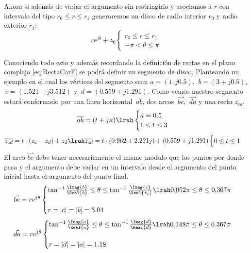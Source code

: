 Ahora si además de variar el argumento sin restringirlo y asociamos a $r$ con intervalo del tipo $r_0\leq r\leq r_1$ generaremos un disco de radio interior $r_0$ y radio exterior $r_1$:
\begin{equation}
    re^{j\theta}+z_0
    \begin{cases}
        r_0\leq r\leq r_1\\
        -\pi<\theta\leq\pi
    \end{cases}
\end{equation}
\begin{figure}[H]
    \centering
    
    \label{fig:DiscoCF}
\end{figure}
Conociendo todo esto y además recordando la definición de rectas en el plano complejo \ref{eq:RectaCarF} se podrá definir un segmento de disco. Planteando un ejemplo en el cual los vértices del segmento sean $a=(1,j0.5)$, $\ b=(3+j0.5)$, $\ c=(1.521+j3.512)$ y $\ d=(0.559+j1.291)$. Como vemos nuestro segmento estará conformado por una linea horizontal $\ \overline{ab}$, dos arcos $\ \vec{bc}$, $\ \Vec{da}$ y una recta $\overline{z_{cd}}$.
\begin{equation}
    \overline{ab}=(t+j\kappa)\lrah
    \begin{cases}
        \kappa=0.5\\
        1\leq t\leq3
    \end{cases}
\end{equation}
\begin{equation}
    \overline{z_{cd}}=t\cdot(z_c-z_d)+z_d \lrah\overline{z_{cd}}=t\cdot(0.962+2.221j)+(0.559+j1.291)
    \begin{cases}
         0\leq t\leq1
    \end{cases}
\end{equation}
El arco $\vec{bc}$ debe tener necesariamente el mismo modulo que los puntos por donde pasa y el argumento debe variar en un intervalo desde el argumento del punto inicial hasta el argumento del punto final.
\begin{equation}
    \vec{bc}=re^{j\theta}
    \begin{cases}
        \tan^{-1}{\frac{\Imag{b}}{\Real{b}}}\leq\theta\leq\tan^{-1}{\frac{\Imag{c}}{\Real{z_c}}}\lrah0.052\pi\leq\theta\leq0.367\pi\\
        \\
        r=|c|=|b|=3.04
    \end{cases}
\end{equation}
\begin{equation}
    \vec{da}=re^{j\theta}
    \begin{cases}
        \tan^{-1}{\frac{\Imag{a}}{\Real{a}}}\leq\theta\leq\tan^{-1}{\frac{\Imag{d}}{\Real{d}}}\lrah0.148\pi\leq\theta\leq0.367\pi\\
        \\
        r=|d|=|a|=1.18
    \end{cases}
\end{equation}
\begin{figure}[H]
    \centering
    
    \label{fig:SegDiscCF}
\end{figure}

